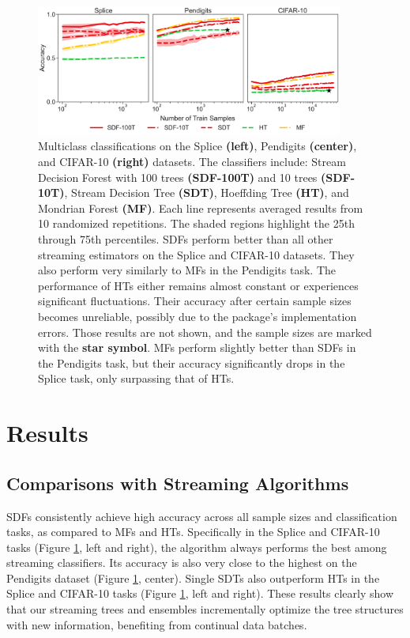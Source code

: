 \begin{figure}[!htb]
\centering
\includegraphics[width=0.9\textwidth]{select_acc_stream}
  \caption{Multiclass classifications on the Splice \textbf{(left)}, Pendigits \textbf{(center)}, and CIFAR-10 \textbf{(right)} datasets. The classifiers include: Stream Decision Forest with 100 trees \textbf{(SDF-100T)} and 10 trees \textbf{(SDF-10T)}, Stream Decision Tree \textbf{(SDT)}, Hoeffding Tree \textbf{(HT)}, and Mondrian Forest \textbf{(MF)}. 
  Each line represents averaged results from 10 randomized repetitions. The shaded regions highlight the 25th through 75th percentiles. SDFs perform better than all other streaming estimators on the Splice and CIFAR-10 datasets. They also perform very similarly to MFs in the Pendigits task. The performance of HTs either remains almost constant or experiences significant fluctuations. Their accuracy after certain sample sizes becomes unreliable, possibly due to the package's implementation errors. Those results are not shown, and the sample sizes are marked with the \textbf{star symbol}. MFs perform slightly better than SDFs in the Pendigits task, but their accuracy significantly drops in the Splice task, only surpassing that of HTs.
  }
\label{fig:select_acc_stream}
\end{figure}

\section{Results}
\label{results}

\subsection{Comparisons with Streaming Algorithms}
\label{results:stream}
SDFs consistently achieve high accuracy across all sample sizes and classification tasks, as compared to MFs and HTs. Specifically in the Splice and CIFAR-10 tasks (Figure \ref{fig:select_acc_stream}, left and right), the algorithm always performs the best among streaming classifiers. Its accuracy is also very close to the highest on the Pendigits dataset (Figure \ref{fig:select_acc_stream}, center). 
Single SDTs also outperform HTs in the Splice and CIFAR-10 tasks (Figure \ref{fig:select_acc_stream}, left and right).
These results clearly show that our streaming trees and ensembles incrementally optimize the tree structures with new information, benefiting from continual data batches.

